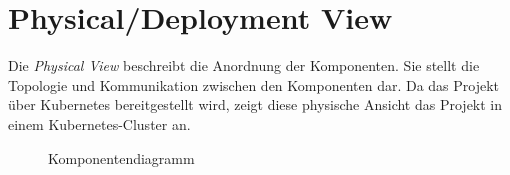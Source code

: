 \section{Physical/Deployment View}

Die \textit{Physical View} beschreibt die Anordnung der Komponenten.
Sie stellt die Topologie und Kommunikation zwischen den Komponenten dar. 
Da das Projekt über Kubernetes bereitgestellt wird, zeigt diese physische Ansicht das Projekt in einem Kubernetes-Cluster an.  

\begin{figure}[!ht]
    \centering
    \caption{Komponentendiagramm}
    \label{fig:component}
\end{figure}

